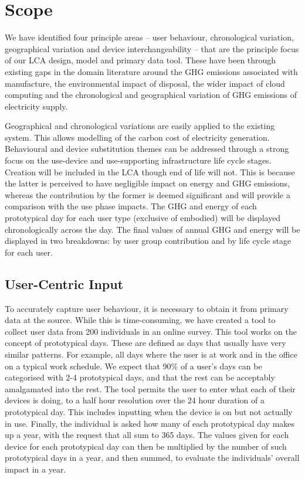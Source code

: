 \documentclass[conference]{IEEEtran}
\begin{document}
\section{Scope}
We have identified four principle areas -- user behaviour,
chronological variation, geographical variation and device
interchangeability -- that are the principle focus of our LCA design,
model and primary data tool. These have been through existing gaps in
the domain literature around the GHG emissions associated with
manufacture, the environmental impact of disposal, the wider impact of
cloud computing and the chronological and geographical variation of
GHG emissions of electricity supply.

Geographical and chronological variations are easily applied to the
existing system. This allows modelling of the carbon cost of
electricity generation. Behavioural and device substitution themes can
be addressed through a strong focus on the use-device and
use-supporting infrastructure life cycle stages. Creation will be
included in the LCA though end of life will not. This is because the
latter is perceived to have negligible impact on energy and GHG
emissions, whereas the contribution by the former is deemed
significant and will provide a comparison with the use phase
impacts. The GHG and energy of each prototypical day for each user
type (exclusive of embodied) will be displayed chronologically across
the day. The final values of annual GHG and energy will be displayed
in two breakdowns: by user group contribution and by life cycle stage
for each user.

\subsection{User-Centric Input}

To accurately capture user behaviour, it is necessary to obtain it
from primary data at the source. While this is time-consuming, we have
created a tool to collect user data from 200 individuals in an online
survey. This tool works on the concept of prototypical days. These are
defined as days that usually have very similar patterns. For example,
all days where the user is at work and in the office on a typical work
schedule. We expect that 90\% of a user's days can be categorised with
2-4 prototypical days, and that the rest can be acceptably amalgamated
into the rest. The tool permits the user to enter what each of their
devices is doing, to a half hour resolution over the 24 hour duration
of a prototypical day. This includes inputting when the device is on
but not actually in use. Finally, the individual is asked how many of
each prototypical day makes up a year, with the request that all sum
to 365 days. The values given for each device for each prototypical
day can then be multiplied by the number of such prototypical days in
a year, and then summed, to evaluate the individuals' overall impact
in a year.
\end{document}
